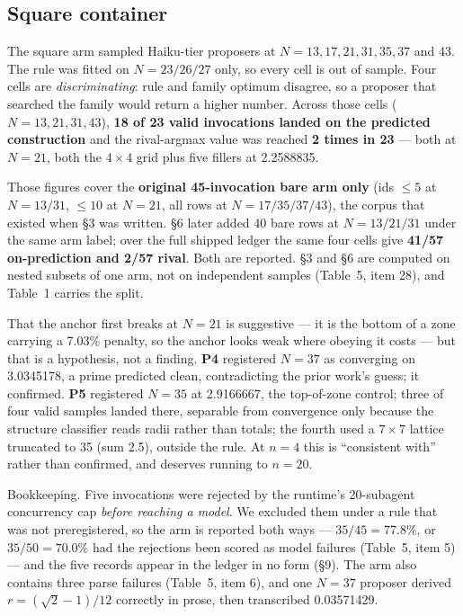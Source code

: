 \documentclass[11pt]{article}
\begin{document}
\subsection{Square container}

The square arm sampled Haiku-tier proposers at $N = 13, 17, 21, 31, 35, 37$ and 43. The rule was
fitted on $N = 23/26/27$ only, so every cell is out of sample. Four cells are \textit{discriminating}:
rule and family optimum disagree, so a proposer that searched the family would return a higher
number. Across those cells ($N = 13, 21, 31, 43$), \textbf{18 of 23 valid invocations landed on the
predicted construction} and the rival-argmax value was reached \textbf{2 times in 23} --- both at
$N = 21$, both the $4\times4$ grid plus five fillers at 2.2588835.

Those figures cover the \textbf{original 45-invocation bare arm only} (ids $\le 5$ at $N = 13/31$, $\le 10$ at
$N = 21$, all rows at $N = 17/35/37/43$), the corpus that existed when \S3 was written. \S6 later
added 40 bare rows at $N = 13/21/31$ under the same arm label; over the full shipped ledger the
same four cells give \textbf{41/57 on-prediction and 2/57 rival}. Both are reported. \S3 and \S6 are
computed on nested subsets of one arm, not on independent samples (Table~5, item 28), and
Table~1 carries the split.

That the anchor first breaks at $N = 21$ is suggestive --- it is the bottom of a zone carrying a
7.03\% penalty, so the anchor looks weak where obeying it costs --- but that is a hypothesis, not
a finding. \textbf{P4} registered $N = 37$ as converging on 3.0345178, a prime predicted clean,
contradicting the prior work's guess; it confirmed. \textbf{P5} registered $N = 35$ at 2.9166667, the
top-of-zone control; three of four valid samples landed there, separable from convergence only
because the structure classifier reads radii rather than totals; the fourth used a $7\times7$
lattice truncated to 35 (sum 2.5), outside the rule. At $n = 4$ this is ``consistent with'' rather
than confirmed, and deserves running to $n = 20$.

Bookkeeping. Five invocations were rejected by the runtime's 20-subagent concurrency cap
\textit{before reaching a model}. We excluded them under a rule that was not preregistered, so the arm
is reported both ways --- $35/45 = 77.8\%$, or $35/50 = 70.0\%$ had the rejections been scored as model
failures (Table~5, item 5) --- and the five records appear in the ledger in no form (\S9). The arm
also contains three parse failures (Table~5, item 6), and one $N = 37$ proposer derived
$r = (\sqrt{2}-1)/12$ correctly in prose, then transcribed 0.03571429.
\end{document}

